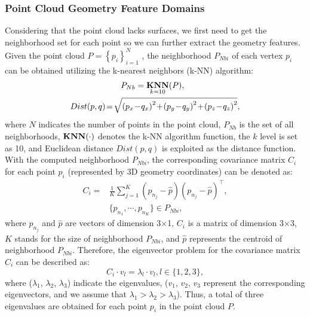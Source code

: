 \documentclass[lettersize,journal]{IEEEtran}
\begin{document}
\subsubsection{  Point Cloud Geometry Feature Domains}
Considering that the point cloud lacks surfaces, we first need to get the neighborhood set for each point so we can further extract the geometry features. Given the point cloud $P=\left\{p_{i}\right\}_{i=1}^{N}$ , the neighborhood $P_{Nbi}$ of each vertex $p_{i}$ can be obtained utilizing the k-nearest neighbors (k-NN) algorithm:
\begin{equation}
\begin{aligned}
    & \quad \quad P_{Nb} = \mathop{\boldsymbol{\rm{KNN}}}\limits_{k=10}(P),\\
   Dist(p,q)\! &=\! \sqrt{\left(p_{x}\!-\!q_{x}\right)^{2}\!+\!\left(p_{y}\!-\!q_{y}\right)^{2}\!+\!\left(p_{z}\!-\!q_{z}\right)^{2}},
\end{aligned}
\end{equation}  
where $N$ indicates the number of points in the point cloud, $P_{Nb}$ is the set of all neighborhoods, $\boldsymbol{\rm{KNN}}(\cdot)$ denotes the k-NN algorithm function, the $k$ level is set as 10, and Euclidean distance $Dist(p,q)$ is exploited as the distance function. With the computed neighborhood $P_{Nbi}$, the corresponding covariance matrix $C_{i}$ for each point $p_{i}$ (represented by 3D geometry coordinates) can be denoted as:
\begin{equation}
\begin{aligned}
     C_{i} = &  \frac{1}{K} \sum_{j=1}^{K} ({p}_{n_{j}}-\hat{p})({p}_{n_{j}}-\hat{p})^{\top},\\
    &  \{{p}_{n_{1}}, \cdots ,{p_{n_{K}}} \} \in P_{Nbi},
\end{aligned}
\end{equation}
{where ${p}_{n_{j}}$ and $\hat{p}$ are vectors of dimension 3$\times$1, $C_{i}$ is a matrix of dimension 3$\times$3, $K$ stands for the size of neighborhood $P_{Nbi}$, and $\hat{p}$ represents the centroid of neighborhood $P_{Nbi}$.} Therefore, the eigenvector problem for the covariance matrix $C_{i}$ can be described as:
\begin{equation}
C_{i} \cdot {v}_{l}=\lambda_{l} \cdot {v}_{l}, l \in\{1,2,3\},
\end{equation}
where ($\lambda_{1}$, $\lambda_{2}$, $\lambda_{3}$) indicate the eigenvalues, (${v}_{1}$, ${v}_{2}$, ${v}_{3}$  represent the corresponding eigenvectors, and we assume that $\lambda_{1}>\lambda_{2}>\lambda_{3}$). Thus, a total of three eigenvalues are obtained for each point $p_{i}$ in the point cloud $P$.
\end{document}
